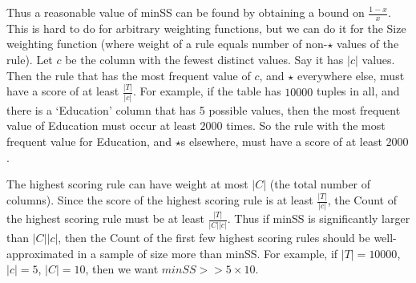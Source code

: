 {Thus a reasonable value of minSS can be found by obtaining a bound on $\frac{1-x}{x}$. This is hard to do for arbitrary weighting functions, but we can do it for the Size weighting function (where weight of a rule equals number of non-$\star$ values of the rule). Let $c$ be the column with the fewest distinct values. Say it has $|c|$ values. Then the rule that has the most frequent value of $c$, and $\star$ everywhere else, must have a score of at least $\frac{|T|}{|c|}$. For example, if the table has $10000$ tuples in all, and there is a `Education' column that has 5 possible values, then the most frequent value of Education must occur at least $2000$ times. So the rule with the most frequent value for Education, and $\star$s elsewhere, must have a score of at least $2000$. 

The highest scoring rule can have weight at most $|C|$ (the total number of columns). Since the score of the highest scoring rule is at least $\frac{|T|}{|c|}$, the Count of the highest scoring rule must be at least $\frac{|T|}{|C||c|}$. Thus if minSS is significantly larger than $|C||c|$, then the Count of the first few highest scoring rules should be well-approximated in a sample of size more than minSS. For example, if $|T| = 10000$, $|c| = 5$, $|C| = 10$, then we want $minSS >> 5 \times 10$.
}
